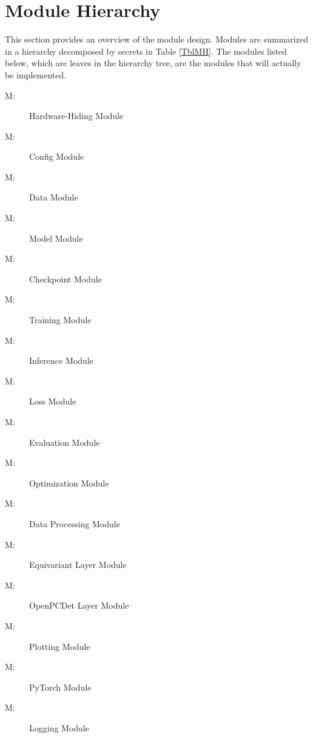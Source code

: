 \documentclass[12pt, titlepage]{article}
\newcounter{mnum}
\newcommand{\mthemnum}{M\themnum}
\begin{document}
\section{Module Hierarchy} \label{SecMH}

This section provides an overview of the module design. Modules are summarized
in a hierarchy decomposed by secrets in Table \ref{TblMH}. The modules listed
below, which are leaves in the hierarchy tree, are the modules that will
actually be implemented.

\begin{description}
\item [ \mthemnum \label{mHH}:] Hardware-Hiding Module
\item [ \mthemnum \label{mCo}:] Config Module
\item [ \mthemnum \label{mD}:] Data Module
\item [ \mthemnum \label{mM}:] Model Module
\item [ \mthemnum \label{mCh}:] Checkpoint Module
\item [ \mthemnum \label{mT}:] Training Module
\item [ \mthemnum \label{mI}:] Inference Module
\item [ \mthemnum \label{mLo}:] Loss Module
\item [ \mthemnum \label{mE}:] Evaluation Module
\item [ \mthemnum \label{mO}:] Optimization Module
\item [ \mthemnum \label{mDP}:] Data Processing Module
\item [ \mthemnum \label{mEL}:] Equivariant Layer Module
\item [ \mthemnum \label{mOL}:] OpenPCDet Layer Module
\item [ \mthemnum \label{mPl}:] Plotting Module
\item [ \mthemnum \label{mPy}:] PyTorch Module
\item [ \mthemnum \label{mLg}:] Logging Module
\end{description}
\end{document}

